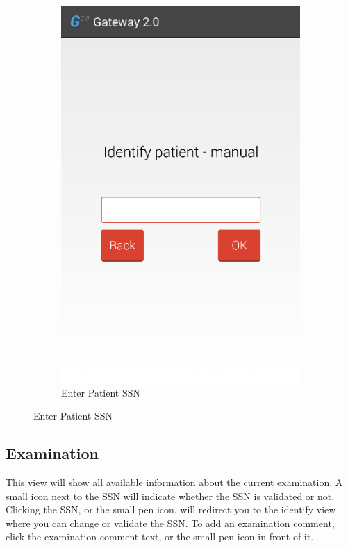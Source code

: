 \begin{figure}[H]
\begin{subfigure}[b]{0.49\textwidth}
        \includegraphics[width=\textwidth]{img/interface/3-Identify2.png}
        \caption*{Enter Patient SSN}
        \label{fig:03identify}
    \end{subfigure}
\end{figure}

\newpage
\subsection*{Examination}
This view will show all available information about the current examination. A small icon next to the SSN will indicate whether the SSN is validated or not. Clicking the SSN, or the small pen icon, will redirect you to the identify view where you can change or validate the SSN. To add an examination comment, click the examination comment text, or the small pen icon in front of it.


